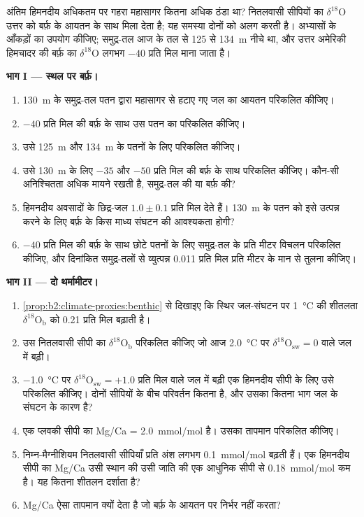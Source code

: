 \begin{problem}[{सप्ताहांत समस्या --- एक सीपी, दो संकेत}]\label{pb:b2:climate-proxies:1}
अंतिम हिमनदीय अधिकतम पर गहरा महासागर कितना अधिक ठंडा था? नितलवासी सीपियों का $\delta^{18}$O
उत्तर को बर्फ़ के आयतन के साथ मिला देता है; यह समस्या दोनों को अलग करती है।
अभ्यासों के आँकड़ों का उपयोग कीजिए; समुद्र-तल आज के तल से 125 से \qty{134}{m} नीचे था, और उत्तर अमेरिकी हिमचादर की
बर्फ़ का $\delta^{18}$O लगभग $-40$ प्रति मिल माना जाता है।

\medskip\noindent\textbf{भाग I --- स्थल पर बर्फ़।}
\begin{enumerate}
  \item \qty{130}{m} के समुद्र-तल पतन द्वारा महासागर से हटाए गए जल का आयतन परिकलित कीजिए।
  \item $-40$ प्रति मिल की बर्फ़ के साथ उस पतन का  परिकलित कीजिए।
  \item उसे \qty{125}{m} और \qty{134}{m} के पतनों के लिए परिकलित कीजिए।
  \item उसे \qty{130}{m} के लिए $-35$ और $-50$ प्रति मिल की बर्फ़ के साथ परिकलित कीजिए। कौन-सी अनिश्चितता
        अधिक मायने रखती है, समुद्र-तल की या बर्फ़ की?
  \item हिमनदीय अवसादों के छिद्र-जल $1.0 \pm 0.1$ प्रति मिल देते हैं। \qty{130}{m} के पतन को
        इसे उत्पन्न करने के लिए बर्फ़ के किस माध्य संघटन की आवश्यकता होगी?
  \item $-40$ प्रति मिल की बर्फ़ के साथ छोटे पतनों के लिए समुद्र-तल के प्रति मीटर विचलन परिकलित कीजिए, और
        दिनांकित समुद्र-तलों से व्युत्पन्न \num{0.011} प्रति मिल प्रति मीटर के मान से तुलना कीजिए।
\end{enumerate}

\medskip\noindent\textbf{भाग II --- दो थर्मामीटर।}
\begin{enumerate}[resume]
  \item \cref{prop:b2:climate-proxies:benthic} से दिखाइए कि स्थिर जल-संघटन पर \qty{1}{\celsius} की
        शीतलता $\delta^{18}\mathrm{O}_{\mathrm{b}}$ को \num{0.21} प्रति मिल बढ़ाती है।
  \item उस नितलवासी सीपी का $\delta^{18}\mathrm{O}_{\mathrm{b}}$ परिकलित कीजिए जो आज
        \qty{2.0}{\celsius} पर $\delta^{18}\mathrm{O}_{\mathrm{sw}} = 0$ वाले जल में बढ़ी।
  \item \qty{-1.0}{\celsius} पर
        $\delta^{18}\mathrm{O}_{\mathrm{sw}} = +1.0$ प्रति मिल वाले जल में बढ़ी एक हिमनदीय सीपी के लिए उसे परिकलित कीजिए। दोनों
        सीपियों के बीच परिवर्तन कितना है, और उसका कितना भाग जल के संघटन के कारण है?
  \item एक प्लवकी सीपी का Mg/Ca = \qty{2.0}{mmol/mol} है। उसका तापमान परिकलित कीजिए।
  \item निम्न-मैग्नीशियम नितलवासी सीपियाँ प्रति अंश लगभग \qty{0.1}{mmol/mol} बढ़ती हैं। एक हिमनदीय सीपी का
        Mg/Ca उसी स्थान की उसी जाति की एक आधुनिक सीपी से \qty{0.18}{mmol/mol} कम
        है। यह कितना शीतलन दर्शाता है?
  \item Mg/Ca ऐसा तापमान क्यों देता है जो बर्फ़ के आयतन पर निर्भर नहीं करता?
\end{enumerate}


\end{problem}
